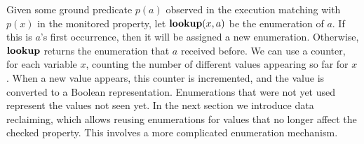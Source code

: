 %
 







Given some ground predicate $p ( a )$ observed in the execution 
matching with $p ( x )$ in the monitored property,
let $\mathbf{lookup} ( x, a )$ be the enumeration of $a$. If this
is $a$'s first occurrence, then it will be assigned a new enumeration.
Otherwise, $\mathbf{lookup}$ returns the enumeration that $a$ received before. We can use a counter, for each variable $x$, counting the number of different values appearing so far for $x$. When a new value appears, this counter is incremented, and the value is converted to
a Boolean representation. Enumerations that were not yet used represent
the values not seen yet. 
In the next section we introduce data reclaiming, which allows 
reusing enumerations for values that no longer affect the checked property. 
This involves a more
complicated enumeration mechanism.


